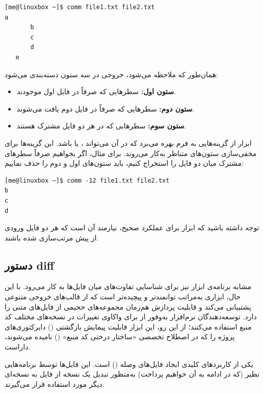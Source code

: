 \begin{latin}
\begin{lstlisting}
[me@linuxbox ~]$ comm file1.txt file2.txt
a
       b
       c
       d
   e
\end{lstlisting}
\end{latin}

همان‌طور که ملاحظه می‌شود، خروجی  در سه ستون دسته‌بندی می‌شود:

\begin{itemize}
  \item \textbf{ستون اول:} سطرهایی که صرفاً در فایل اول موجودند.
  \item \textbf{ستون دوم:} سطرهایی که صرفاً در فایل دوم یافت می‌شوند.
  \item \textbf{ستون سوم:} سطرهایی که در هر دو فایل مشترک هستند.
\end{itemize}

ابزار  از گزینه‌هایی به فرم  بهره می‌برد که در آن  می‌تواند ،  یا  باشد. این گزینه‌ها برای مخفی‌سازی ستون‌های متناظر به‌کار می‌روند. برای مثال، اگر بخواهیم صرفاً سطرهای مشترک میان دو فایل را استخراج کنیم، باید ستون‌های اول و دوم را حذف نماییم:

\begin{latin}
\begin{lstlisting}
[me@linuxbox ~]$ comm -12 file1.txt file2.txt
b
c
d
\end{lstlisting}
\end{latin}

توجه داشته باشید که ابزار  برای عملکرد صحیح، نیازمند آن است که هر دو فایل ورودی از پیش مرتب‌سازی شده باشند.

\subsection{دستور diff}

مشابه برنامه‌ی  ابزار  نیز برای شناسایی تفاوت‌های میان فایل‌ها به کار می‌رود. با این حال،  ابزاری به‌مراتب توانمندتر و پیچیده‌تر است که از قالب‌های خروجی متنوعی پشتیبانی می‌کند و قابلیت پردازش هم‌زمان مجموعه‌های حجیمی از فایل‌های متنی را دارد. توسعه‌دهندگان نرم‌افزار به‌وفور از  برای واکاوی تغییرات در نسخه‌های مختلف کد منبع استفاده می‌کنند؛ از این رو، این ابزار قابلیت پیمایش بازگشتی () دایرکتوری‌های پروژه را که در اصطلاح تخصصی «ساختار درختی کد منبع» () نامیده می‌شوند، داراست.

یکی از کاربردهای کلیدی  ایجاد فایل‌های وصله () است. این فایل‌ها توسط برنامه‌هایی نظیر  (که در ادامه به آن خواهیم پرداخت) به‌منظور تبدیل یک نسخه از فایل به نسخه‌ای دیگر مورد استفاده قرار می‌گیرند.


